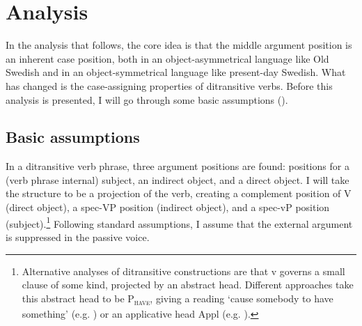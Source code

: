 \documentclass[output=paper]{langscibook}
\begin{document}
\section{Analysis}\label{sec:falk:4}


In the analysis that follows, the core idea is that the middle argument position is an inherent case position, both in an object-asymmetrical language like Old Swedish and in an object-symmetrical language like present-day Swedish. What has changed is the case-assigning properties of ditransitive verbs. Before this analysis is presented, I will go through some basic assumptions ().

\subsection{Basic assumptions}\label{sec:falk:4.1}


In a ditransitive verb phrase, three argument positions are found: positions for a (verb phrase internal) subject, an indirect object, and a direct object. I will take the structure to be a projection of the verb, creating a complement position of V (direct object), a spec-VP position (indirect object), and a spec-vP position (subject).\footnote{Alternative analyses of ditransitive constructions are that v governs a small clause of some kind, projected by an abstract head. Different approaches take this abstract head to be P\textsc{\textsubscript{have}}, giving a reading ‘cause somebody to have something’ (e.g. \citealt{HarleyJung2015}) or an applicative head Appl (e.g. \citealt{Pylkkanen2008}).} Following standard assumptions, I assume that the external argument is suppressed in the passive voice.
\end{document}
